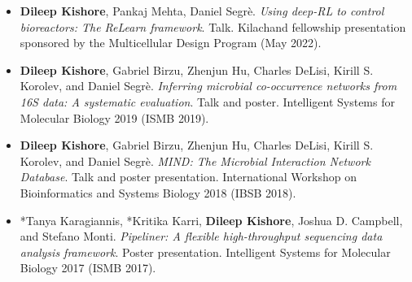\documentclass[10pt]{developercv} %
\begin{document}

\begin{minipage}[t]{\textwidth}
	\vspace{-\baselineskip} %

  \nocite{federicoPipelinerNextflowBasedFramework2019,pachecoFAIRRepresentationsMicrobial2022}
  \nocite{kishoreInferringMicrobialCooccurrence2020,kishoreIntroducingBenchmarkingAccuracy2020,huResourceComparisonIntegration2022}
  \printbibliography[heading=none]

\end{minipage}




\begin{minipage}[t]{\textwidth}
	\vspace{-\baselineskip} %


    \begin{itemize}[itemsep=-2pt]
      \item \textbf{Dileep Kishore}, Pankaj Mehta, Daniel Segrè. \emph{Using deep-RL to control bioreactors: The ReLearn framework}. Talk. Kilachand fellowship presentation sponsored by the Multicellular Design Program (May 2022).
      \item \textbf{Dileep Kishore}, Gabriel Birzu, Zhenjun Hu, Charles DeLisi, Kirill S. Korolev, and Daniel Segrè. \emph{Inferring microbial co-occurrence networks from 16S data: A systematic evaluation}. Talk and poster. Intelligent Systems for Molecular Biology 2019 (ISMB 2019).
      \item \textbf{Dileep Kishore}, Gabriel Birzu, Zhenjun Hu, Charles DeLisi, Kirill S. Korolev, and Daniel Segrè. \emph{MIND: The Microbial Interaction Network Database}. Talk and poster presentation. International Workshop on Bioinformatics and Systems Biology 2018 (IBSB 2018).
      \item *Tanya Karagiannis, *Kritika Karri, \textbf{Dileep Kishore}, Joshua D. Campbell, and Stefano Monti. \emph{Pipeliner: A flexible high-throughput sequencing data analysis framework}. Poster presentation. Intelligent Systems for Molecular Biology 2017 (ISMB 2017).
    \end{itemize}

\end{minipage}
\end{document}
